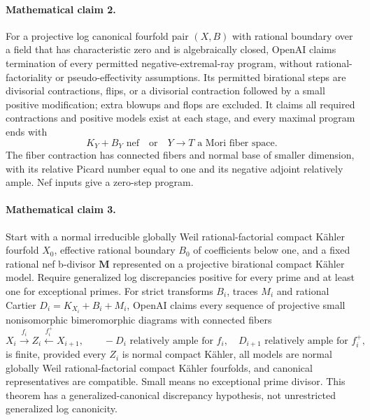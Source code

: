 \documentclass[11pt]{article}
\begin{document}
\paragraph{Mathematical claim 2.} For a projective log canonical fourfold pair $(X,B)$ with rational boundary over a field that has characteristic zero and is algebraically closed, OpenAI claims termination of every permitted negative-extremal-ray program, without rational-factoriality or pseudo-effectivity assumptions. Its permitted birational steps are divisorial contractions, flips, or a divisorial contraction followed by a small positive modification; extra blowups and flops are excluded. It claims all required contractions and positive models exist at each stage, and every maximal program ends with
\[
K_Y+B_Y\text{ nef}\quad\text{or}\quad Y\to T\text{ a Mori fiber space}.
\]
The fiber contraction has connected fibers and normal base of smaller dimension, with its relative Picard number equal to one and its negative adjoint relatively ample. Nef inputs give a zero-step program.

\paragraph{Mathematical claim 3.} Start with a normal irreducible globally Weil rational-factorial compact Kähler fourfold $X_0$, effective rational boundary $B_0$ of coefficients below one, and a fixed rational nef b-divisor $\mathbf M$ represented on a projective birational compact Kähler model. Require generalized log discrepancies positive for every prime and at least one for exceptional primes. For strict transforms $B_i$, traces $M_i$ and rational Cartier $D_i=K_{X_i}+B_i+M_i$, OpenAI claims every sequence of projective small nonisomorphic bimeromorphic diagrams with connected fibers
\[
X_i\xrightarrow{f_i}Z_i\xleftarrow{f_i^+}X_{i+1},\qquad
-D_i\text{ relatively ample for }f_i,\quad D_{i+1}\text{ relatively ample for }f_i^+,
\]
is finite, provided every $Z_i$ is normal compact Kähler, all models are normal globally Weil rational-factorial compact Kähler fourfolds, and canonical representatives are compatible. Small means no exceptional prime divisor. This theorem has a generalized-canonical discrepancy hypothesis, not unrestricted generalized log canonicity.
\end{document}
